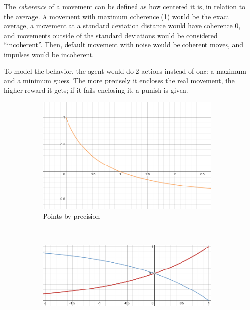 The \emph{coherence} of a movement can be defined as how centered it is, in relation to the average. A movement with maximum coherence (1) would be the exact average, a movement at a standard deviation distance would have coherence 0, and movements outside of the standard deviations would be considered ``incoherent''. Then, default movement with noise would be coherent moves, and impulses would be incoherent.

To model the behavior, the agent would do 2 actions instead of one: a maximum and a minimum guess. The more precisely it encloses the real movement, the higher reward it gets; if it fails enclosing it, a punish is given.

\begin{figure}
    \centering
    \begin{subfigure}[b]{0.3\textwidth}
        \includegraphics[width=\textwidth]{img/stdPrecision.png}
        \caption{Points by precision}
        \label{fig:prec}
    \end{subfigure}
    ~ %
    \begin{subfigure}[b]{0.3\textwidth}
        \includegraphics[width=\textwidth]{img/stdFactors.png}

\end{subfigure}
\end{figure}
